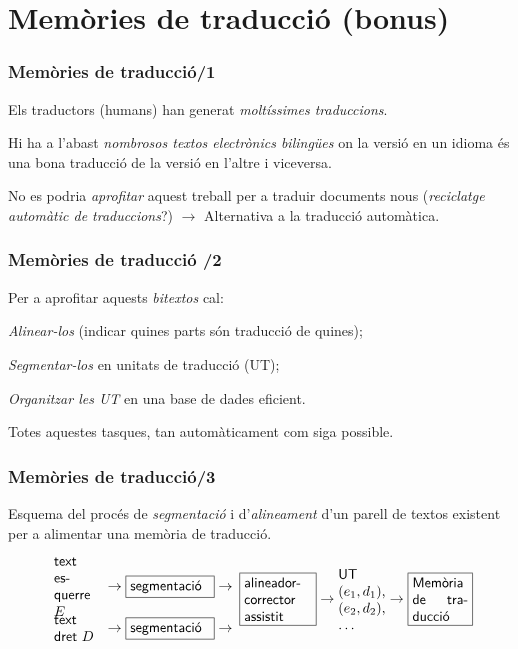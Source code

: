 \documentclass{beamer}
\newcommand{\empha}[1]{\emph{#1}\/}
\begin{document}
\section{Memòries de traducció (bonus)}
\begin{frame}
\frametitle{Memòries de traducció/1}

{
{Els traductors (humans) han generat 
\empha{moltíssimes traduccions}.}

{Hi ha a l'abast \empha{nombrosos textos electrònics bilingües}
  on la versió en un idioma  és una bona traducció de la versió en l'altre i
  viceversa.}

{No es podria \empha{aprofitar} aquest treball per 
a traduir documents nous (\empha{reciclatge automàtic de 
traduccions}?) $\to$ Alternativa a la traducció automàtica.}
}
\end{frame}

\begin{frame}
\frametitle{ Memòries de traducció /2}

{

{Per a aprofitar aquests \empha{bitextos} cal:}
\begin{itemize}\setlength{\itemsep}{0pt}
{\item \empha{Alinear-los} (indicar quines parts són 
traducció de quines);}
{\item \empha{Segmentar-los} en unitats de traducció (UT);}
{\item \empha{Organitzar les UT} en una base de dades eficient.}
\end{itemize}
{Totes aquestes tasques, tan automàticament com 
siga possible.}
}
\end{frame}

\begin{frame}

\frametitle{ Memòries de traducció/3}

Esquema del procés de \empha{segmentació} i d'\empha{alineament} d'un
  parell de textos existent per a alimentar
  una memòria de traducció.


\small{
$$
\begin{array}{rcl}
\mbox{\parbox{1.0cm}{\textsf{text esquerre $E$}}} &\to \mbox{\framebox{\parbox{2.0cm}{\textsf{segmentació}}}} 
\to \\
\mbox{\parbox{1.0cm}{\textsf{text dret $D$}}} &\to \mbox{\framebox{\parbox{2.0cm}{\textsf{segmentació}}}} 
\to \\
\end{array}
\mbox{\framebox{\parbox{1.7cm}{\textsf{alineador- corrector assistit}}}}
\to \mbox{\parbox{1.2cm}{\textsf{UT} $(e_1,d_1)$, $(e_2,d_2)$, \ldots}} \to \mbox{\framebox{\parbox{1.4cm}{\textsf{Memòria de traducció}}}}
$$
}



\end{frame}
\end{document}
